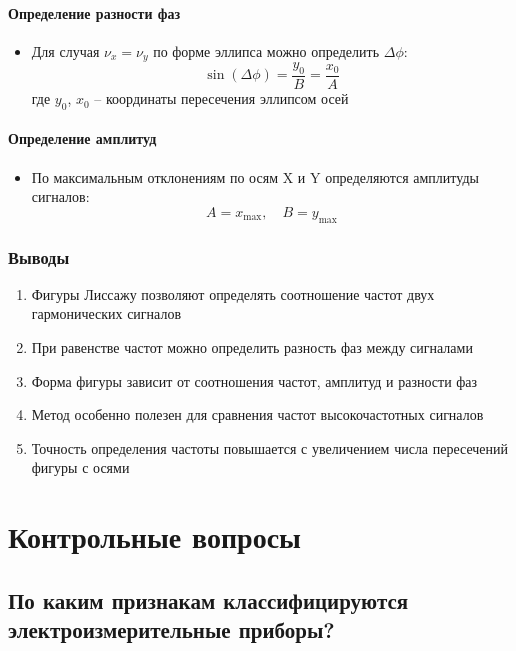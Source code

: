 \documentclass[14pt, a4paper, twoside]{extreport}
\begin{document}
\subsubsection{Определение разности фаз}
\begin{itemize}
  \item Для случая $\nu_x = \nu_y$ по форме эллипса можно определить $\Delta\phi$:
    \[
      \sin(\Delta\phi) = \frac{y_0}{B} = \frac{x_0}{A}
    \]
    где $y_0$, $x_0$ -- координаты пересечения эллипсом осей
\end{itemize}

\subsubsection{Определение амплитуд}
\begin{itemize}
  \item По максимальным отклонениям по осям X и Y определяются амплитуды сигналов:
    \[
      A = x_{\text{max}}, \quad B = y_{\text{max}}
    \]
\end{itemize}

\subsection{Выводы}

\begin{enumerate}
  \item Фигуры Лиссажу позволяют определять соотношение частот двух гармонических сигналов
  \item При равенстве частот можно определить разность фаз между сигналами
  \item Форма фигуры зависит от соотношения частот, амплитуд и разности фаз
  \item Метод особенно полезен для сравнения частот высокочастотных сигналов
  \item Точность определения частоты повышается с увеличением числа пересечений фигуры с осями
\end{enumerate}

\chapter{Контрольные вопросы}

\section{По каким признакам классифицируются электроизмерительные приборы?}
\end{document}
